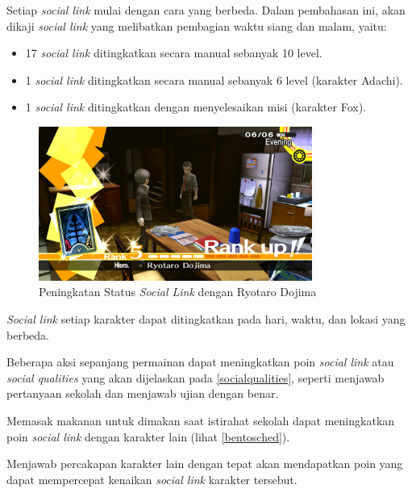 \begin{enumerate}
    {\item Setiap \textit{social link} mulai dengan cara yang berbeda. Dalam pembahasan ini, akan dikaji \textit{social link} yang melibatkan pembagian waktu siang dan malam, yaitu:
          \begin{itemize}
              \item 17 \textit{social link} ditingkatkan secara manual sebanyak 10 level.
              \item 1 \textit{social link} ditingkatkan secara manual sebanyak 6 level (karakter Adachi).
              \item 1 \textit{social link} ditingkatkan dengan menyelesaikan misi (karakter Fox).
          \end{itemize}
          }
          \begin{figure}[htbp]
              \centering
              \includegraphics[width=0.8\textwidth]{resources/Dokumentasi/Screenshot (402).png}
              \caption{\label{dojima}Peningkatan Status \textit{Social Link} dengan Ryotaro Dojima}
          \end{figure}
    \item \textit{Social link} setiap karakter dapat ditingkatkan pada hari, waktu, dan lokasi yang berbeda.
    \item Beberapa aksi sepanjang permainan dapat meningkatkan poin \textit{social link} atau \textit{social qualities} yang akan dijelaskan pada \autoref{socialqualities}, seperti menjawab pertanyaan sekolah dan menjawab ujian dengan benar.
    \item Memasak makanan untuk dimakan saat istirahat sekolah dapat meningkatkan poin \textit{social link} dengan karakter lain (lihat \autoref{bentosched}).
    \item Menjawab percakapan karakter lain dengan tepat akan mendapatkan poin yang dapat mempercepat kenaikan \textit{social link} karakter tersebut.
\end{enumerate}


